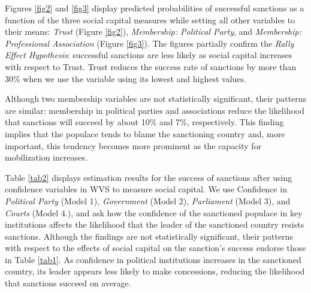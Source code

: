 \documentclass[12pt,]{article}
\begin{document}
Figures \ref{fig2} and \ref{fig3} display predicted probabilities of
successful sanctions as a function of the three social capital measures
while setting all other variables to their means: \emph{Trust} (Figure
\ref{fig2}), \emph{Membership: Political Party}, and \emph{Membership:
Professional Association} (Figure \ref{fig3}). The figures partially
confirm the \emph{Rally Effect Hypothesis}: successful sanctions are
less likely as social capital increases with respect to Trust. Trust
reduces the success rate of sanctions by more than 30\% when we use the
variable using its lowest and highest values.

Although two membership variables are not statistically significant,
their patterns are similar: membership in political parties and
associations reduce the likelihood that sanctions will succeed by about
10\% and 7\%, respectively. This finding implies that the populace tends
to blame the sanctioning country and, more important, this tendency
becomes more prominent as the capacity for mobilization increases.

Table \ref{tab2} displays estimation results for the success of
sanctions after using confidence variables in WVS to measure social
capital. We use Confidence in \emph{Political Party} (Model 1),
\emph{Government} (Model 2), \emph{Parliament} (Model 3), and
\emph{Courts} (Model 4.), and ask how the confidence of the sanctioned
populace in key institutions affects the likelihood that the leader of
the sanctioned country resists sanctions. Although the findings are not
statistically significant, their patterns with respect to the effects of
social capital on the sanction's success endorse those in Table
\ref{tab1}. As confidence in political institutions increases in the
sanctioned country, its leader appears less likely to make concessions,
reducing the likelihood that sanctions succeed on average.
\end{document}
